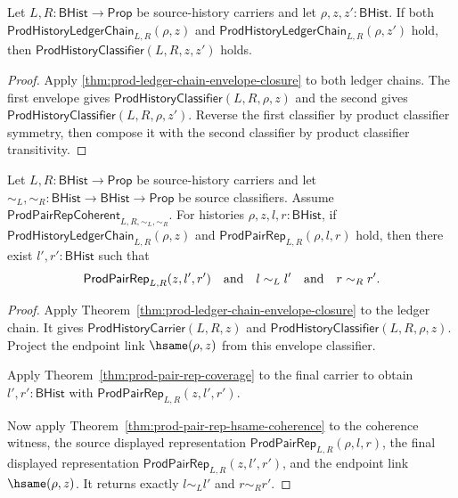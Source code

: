 \begin{theorem}
\label{thm:prod-history-ledger-chain-shared-raw-visible-classifier}
Let $L,R:\mathsf{BHist}\to\mathsf{Prop}$ be source-history carriers and let
$\rho,z,z':\mathsf{BHist}$. If both
$\mathsf{ProdHistoryLedgerChain}_{L,R}(\rho,z)$ and
$\mathsf{ProdHistoryLedgerChain}_{L,R}(\rho,z')$ hold, then
$\mathsf{ProdHistoryClassifier}(L,R,z,z')$ holds.
\end{theorem}
\begin{proof}
Apply \autoref{thm:prod-ledger-chain-envelope-closure} to both ledger chains.
The first envelope gives
$\mathsf{ProdHistoryClassifier}(L,R,\rho,z)$ and the second gives
$\mathsf{ProdHistoryClassifier}(L,R,\rho,z')$. Reverse the first classifier by
product classifier symmetry, then compose it with the second classifier by
product classifier transitivity.
\end{proof}

\begin{theorem}
\label{thm:prod-ledger-chain-displayed-component-readback}
Let $L,R:\mathsf{BHist}\to\mathsf{Prop}$ be source-history carriers and let
$\sim_L,\sim_R:\mathsf{BHist}\to\mathsf{BHist}\to\mathsf{Prop}$ be source
classifiers. Assume $\mathsf{ProdPairRepCoherent}_{L,R,\sim_L,\sim_R}$.
For histories $\rho,z,l,r:\mathsf{BHist}$, if
$\mathsf{ProdHistoryLedgerChain}_{L,R}(\rho,z)$ and
$\mathsf{ProdPairRep}_{L,R}(\rho,l,r)$ hold, then there exist
$l',r':\mathsf{BHist}$ such that
$$
\mathsf{ProdPairRep}_{L,R}(z,l',r')
\quad\hbox{and}\quad
l\sim_L l'
\quad\hbox{and}\quad
r\sim_R r'.
$$
\end{theorem}
\begin{proof}
Apply Theorem~\ref{thm:prod-ledger-chain-envelope-closure} to the ledger chain.
It gives $\mathsf{ProdHistoryCarrier}(L,R,z)$ and
$\mathsf{ProdHistoryClassifier}(L,R,\rho,z)$. Project the endpoint link
$\hsame(\rho,z)$ from this envelope classifier.

Apply Theorem~\ref{thm:prod-pair-rep-coverage} to the final carrier to obtain
$l',r':\mathsf{BHist}$ with
$\mathsf{ProdPairRep}_{L,R}(z,l',r')$.

Now apply Theorem~\ref{thm:prod-pair-rep-hsame-coherence} to the coherence
witness, the source displayed representation
$\mathsf{ProdPairRep}_{L,R}(\rho,l,r)$, the final displayed representation
$\mathsf{ProdPairRep}_{L,R}(z,l',r')$, and the endpoint link
$\hsame(\rho,z)$. It returns exactly $l\sim_L l'$ and $r\sim_R r'$.
\end{proof}

